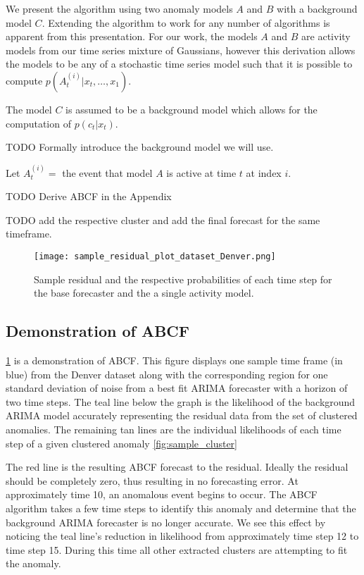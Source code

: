 We present the algorithm using two anomaly models $A$ and $B$ with a background model $C$.  Extending the algorithm to work for any number of algorithms is apparent from this presentation.  For our work, the models $A$ and $B$ are activity models from our time series mixture of Gaussians, however this derivation allows the models to be any of a stochastic time series model such that it is possible to compute $p(A^{(i)}_{t}|x_{t}, \ldots, x_{1})$.

The model $C$ is assumed to be a background model which allows for the computation of $p(c_{t}|x_{t})$.  

TODO Formally introduce the background model we will use.

Let $A_{t}^{(i)} = $ the event that model $A$ is active at time $t$ at index $i$.  

TODO Derive ABCF in the Appendix

TODO add the respective cluster and add the final forecast for the same timeframe.


\begin{figure}[!h]
	\begin{center}
		\texttt{[image: sample\_residual\_plot\_dataset\_Denver.png]}
	\end{center}
	\caption{Sample residual and the respective probabilities of each time step for the base forecaster and the a single activity model.}
	\label{fig:sample_abcf_residual}
\end{figure}


\subsection{Demonstration of ABCF}
\ref{fig:sample_abcf_residual} is a demonstration of ABCF.  This figure displays one sample time frame (in blue) from the Denver dataset along with the corresponding region for one standard deviation of noise from a best fit ARIMA forecaster with a horizon of two time steps.  The teal line below the graph is the likelihood of the background ARIMA model accurately representing the residual data from the set of clustered anomalies.  The remaining tan lines are the individual likelihoods of each time step of a given clustered anomaly \ref{fig:sample_cluster}  

The red line is the resulting ABCF forecast to the residual.  Ideally the residual should be completely zero, thus resulting in no forecasting error.  At approximately time 10, an anomalous event begins to occur.  The ABCF algorithm takes a few time steps to identify this anomaly and determine that the background ARIMA forecaster is no longer accurate.  We see this effect by noticing the teal line's reduction in likelihood from approximately time step 12 to time step 15.  During this time all other extracted clusters are attempting to fit the anomaly.

